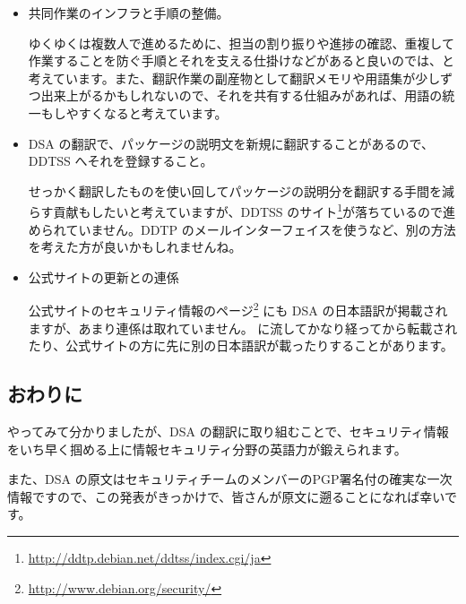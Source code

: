 \documentclass[mingoth,a4paper]{jsarticle}
\begin{document}
\begin{itemize}


\item 共同作業のインフラと手順の整備。

ゆくゆくは複数人で進めるために、担当の割り振りや進捗の確認、重複して作業することを防ぐ手順とそれを支える仕掛けなどがあると良いのでは、と考えています。また、翻訳作業の副産物として翻訳メモリや用語集が少しずつ出来上がるかもしれないので、それを共有する仕組みがあれば、用語の統一もしやすくなると考えています。

\item DSA の翻訳で、パッケージの説明文を新規に翻訳することがあるので、DDTSS へそれを登録すること。

せっかく翻訳したものを使い回してパッケージの説明分を翻訳する手間を減らす貢献もしたいと考えていますが、DDTSS のサイト\footnote{\url{http://ddtp.debian.net/ddtss/index.cgi/ja}}が落ちているので進められていません。DDTP のメールインターフェイスを使うなど、別の方法を考えた方が良いかもしれませんね。

\item 公式サイトの更新との連係

公式サイトのセキュリティ情報のページ\footnote{\url{http://www.debian.org/security/}} にも DSA の日本語訳が掲載されますが、あまり連係は取れていません。 に流してかなり経ってから転載されたり、公式サイトの方に先に別の日本語訳が載ったりすることがあります。

\end{itemize}


\subsection{おわりに}

やってみて分かりましたが、DSA の翻訳に取り組むことで、セキュリティ情報をいち早く掴める上に情報セキュリティ分野の英語力が鍛えられます。

また、DSA の原文はセキュリティチームのメンバーのPGP署名付の確実な一次情報ですので、この発表がきっかけで、皆さんが原文に遡ることになれば幸いです。
\end{document}
